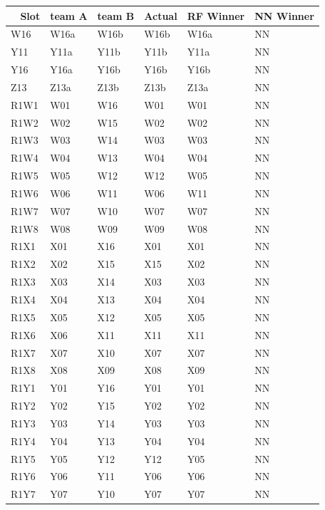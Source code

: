 \documentclass[conference]{IEEEtran}
\begin{document}
{\begin{table}[H]
	\centering
    \begin{tabular}{|l|l|l|l|l|l|}
    \hline
    ~   \textbf{Slot}  & \textbf{team A} & \textbf{team B} & \textbf{Actual} & \textbf{RF Winner} & \textbf{NN Winner} \\ \hline
W16 & W16a & W16b & W16b & W16a &  NN  \\ \hline
Y11 & Y11a & Y11b & Y11b & Y11a &  NN  \\ \hline
Y16 & Y16a & Y16b & Y16b & Y16b &  NN  \\ \hline
Z13 & Z13a & Z13b & Z13b & Z13a &  NN  \\ \hline
R1W1 & W01 & W16 & W01 & W01 &  NN  \\ \hline
R1W2 & W02 & W15 & W02 & W02 &  NN  \\ \hline
R1W3 & W03 & W14 & W03 & W03 &  NN  \\ \hline
R1W4 & W04 & W13 & W04 & W04 &  NN  \\ \hline
R1W5 & W05 & W12 & W12 & W05 &  NN  \\ \hline
R1W6 & W06 & W11 & W06 & W11 &  NN  \\ \hline
R1W7 & W07 & W10 & W07 & W07 &  NN  \\ \hline
R1W8 & W08 & W09 & W09 & W08 &  NN  \\ \hline
R1X1 & X01 & X16 & X01 & X01 &  NN  \\ \hline
R1X2 & X02 & X15 & X15 & X02 &  NN  \\ \hline
R1X3 & X03 & X14 & X03 & X03 &  NN  \\ \hline
R1X4 & X04 & X13 & X04 & X04 &  NN  \\ \hline
R1X5 & X05 & X12 & X05 & X05 &  NN  \\ \hline
R1X6 & X06 & X11 & X11 & X11 &  NN  \\ \hline
R1X7 & X07 & X10 & X07 & X07 &  NN  \\ \hline
R1X8 & X08 & X09 & X08 & X09 &  NN  \\ \hline
R1Y1 & Y01 & Y16 & Y01 & Y01 &  NN  \\ \hline
R1Y2 & Y02 & Y15 & Y02 & Y02 &  NN  \\ \hline
R1Y3 & Y03 & Y14 & Y03 & Y03 &  NN  \\ \hline
R1Y4 & Y04 & Y13 & Y04 & Y04 &  NN  \\ \hline
R1Y5 & Y05 & Y12 & Y12 & Y05 &  NN  \\ \hline
R1Y6 & Y06 & Y11 & Y06 & Y06 &  NN  \\ \hline
R1Y7 & Y07 & Y10 & Y07 & Y07 &  NN  \\ \hline

\end{tabular}
\end{table}}
\end{document}
